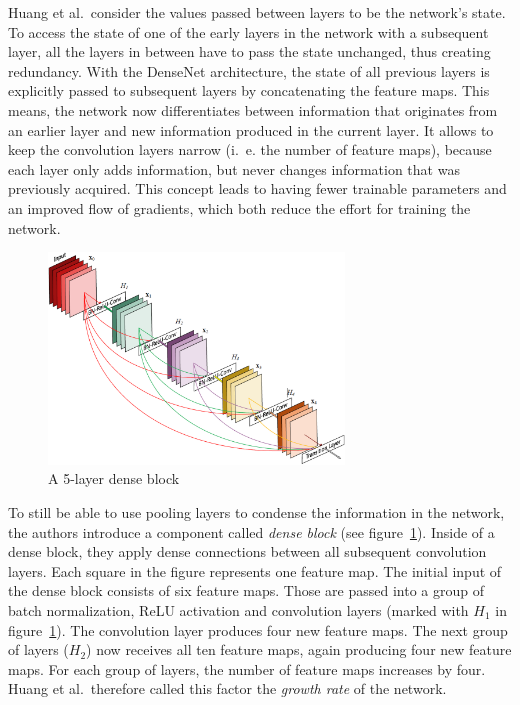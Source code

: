 Huang et al.\ consider the values passed between layers to be the network's state. To access the state of one of the early layers in the network with a subsequent layer, all the layers in between have to pass the state unchanged, thus creating redundancy. With the DenseNet architecture, the state of all previous layers is explicitly passed to subsequent layers by concatenating the feature maps. This means, the network now differentiates between information that originates from an earlier layer and new information produced in the current layer. It allows to keep the convolution layers narrow (i.~e. the number of feature maps), because each layer only adds information, but never changes information that was previously acquired. This concept leads to having fewer trainable parameters and an improved flow of gradients, which both reduce the effort for training the network.~\cite{densenet18}

\begin{figure}[h]
    \centering
    \includegraphics[width=0.7\textwidth]{images/dense-net-architecture}
    \caption{A 5-layer dense block~\cite{densenet18}}
    \label{fig:dense_block}
\end{figure}

To still be able to use pooling layers to condense the information in the network, the authors introduce a component called \emph{dense block} (see figure~\ref{fig:dense_block}). Inside of a dense block, they apply dense connections between all subsequent convolution layers. Each square in the figure represents one feature map. The initial input of the dense block consists of six feature maps. Those are passed into a group of batch normalization, ReLU activation and convolution layers (marked with $H_1$ in figure~\ref{fig:dense_block}). The convolution layer produces four new feature maps. The next group of layers ($H_2$) now receives all ten feature maps, again producing four new feature maps. For each group of layers, the number of feature maps increases by four. Huang et al.\ therefore called this factor the \emph{growth rate} of the network.

